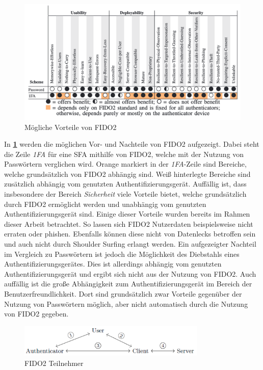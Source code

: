 \begin{figure}[h]
	\centering 
	\includegraphics[width=1\textwidth]{img/abbildungen/fido2_usability.png}
	\captionsetup{format=hang}
	\caption{Mögliche Vorteile von FIDO2 \cite{lyastani2020fido2}} \label{fido2-pros}
\end{figure}

In \textbf{\ref{fido2-pros}} werden die möglichen Vor- und Nachteile von \ac{FIDO}2 aufgezeigt. Dabei steht die Zeile \textit{1FA} für eine \ac{SFA} mithilfe von \ac{FIDO}2, welche mit der Nutzung von Passwörtern verglichen wird. Orange markiert in der \textit{1FA}-Zeile sind Bereiche, welche grundsätzlich von \ac{FIDO}2 abhängig sind. Weiß hinterlegte Bereiche sind zusätzlich abhängig vom genutzten Authentifizierungsgerät. Auffällig ist, dass insbesondere der Bereich \textit{Sicherheit} viele Vorteile bietet, welche grundsätzlich durch \ac{FIDO}2 ermöglicht werden und unabhängig vom genutzten Authentifizierungsgerät sind. Einige dieser Vorteile wurden bereits im Rahmen dieser Arbeit betrachtet. So lassen sich \ac{FIDO}2 Nutzerdaten beispielsweise nicht erraten oder phishen. Ebenfalls können diese nicht von Datenlecks betroffen sein und auch nicht durch Shoulder Surfing erlangt werden. Ein aufgezeigter Nachteil im Vergleich zu Passwörtern ist jedoch die Möglichkeit des Diebstahls eines Authentifizierungsgerätes. Dies ist allerdings abhängig vom genutzten Authentifizierungsgerät und ergibt sich nicht aus der Nutzung von \ac{FIDO}2. Auch auffällig ist die große Abhängigkeit zum Authentifizierungsgerät im Bereich der Benutzerfreundlichkeit. Dort sind grundsätzlich zwar Vorteile gegenüber der Nutzung von Passwörtern möglich, aber nicht automatisch durch die Nutzung von \ac{FIDO}2 gegeben. 

\begin{figure}[h]
	\centering 
	\includegraphics[width=0.8\textwidth]{img/abbildungen/fido2_com.png}
	\captionsetup{format=hang}
	\caption{FIDO2 Teilnehmer \cite{barbosa2021provable}} \label{fido2-channels}
\end{figure}

